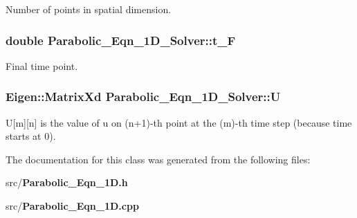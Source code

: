 Number of points in spatial dimension. 

\subsubsection{\setlength{\rightskip}{0pt plus 5cm}double \bf{Parabolic\_\-Eqn\_\-1D\_\-Solver::t\_\-F}\hspace{0.3cm}{\tt  [private]}}\label{classParabolic__Eqn__1D__Solver_bab464d3a381d40cbb6309890334f83a}


Final time point. 

\subsubsection{\setlength{\rightskip}{0pt plus 5cm}Eigen::Matrix\-Xd \bf{Parabolic\_\-Eqn\_\-1D\_\-Solver::U}\hspace{0.3cm}{\tt  [private]}}\label{classParabolic__Eqn__1D__Solver_0306c84a031702519a27d4801becaabb}


U[m][n] is the value of u on (n+1)-th point at the (m)-th time step (because time starts at 0). 



The documentation for this class was generated from the following files:\begin{CompactItemize}
\item 
src/\bf{Parabolic\_\-Eqn\_\-1D.h}\item 
src/\bf{Parabolic\_\-Eqn\_\-1D.cpp}\end{CompactItemize}
